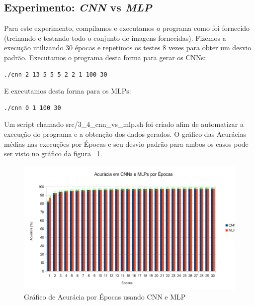\documentclass[12pt, a4paper, brazil, portuguese]{article}
\begin{document}
\subsection{Experimento: \emph{CNN} vs \emph{MLP}}

Para este experimento, compilamos e executamos o programa como foi fornecido (treinando e testando
todo o conjunto de imagens fornecidas). Fizemos a execução utilizando 30 épocas e repetimos os
testes 8 vezes para obter um desvio padrão. Executamos o programa desta forma para gerar os CNNs:

\begin{verbatim}
./cnn 2 13 5 5 5 2 2 1 100 30
\end{verbatim}

E executamos desta forma para os MLPs:

\begin{verbatim}
./cnn 0 1 100 30
\end{verbatim}

Um script chamado src\//3\_4\_cnn\_vs\_mlp.sh foi criado afim de automatizar a execução do programa
e a obtenção dos dados gerados. O gráfico das Acurácias médias nas execuções por Épocas e seu desvio
padrão para ambos os casos pode ser visto no gráfico da figura ~\ref{fig:cnn_mlp}.

\begin{figure}
  \centering
  \includegraphics[width = \textwidth]{gra.pdf}
  \caption{Gráfico de Acurácia por Épocas usando CNN e MLP}
  \label{fig:cnn_mlp}
\end{figure}
\end{document}
